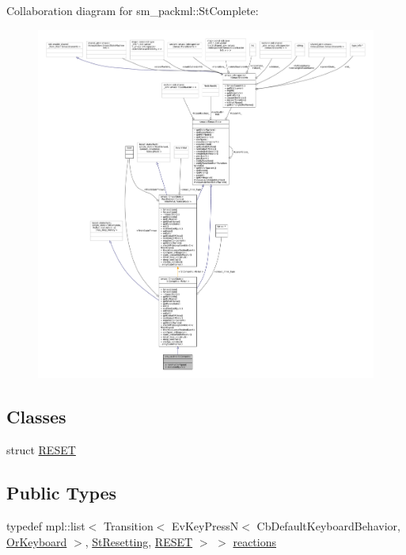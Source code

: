 Collaboration diagram for sm\+\_\+packml\+:\+:St\+Complete\+:
\nopagebreak
\begin{figure}[H]
\begin{center}
\leavevmode
\includegraphics[width=350pt]{structsm__packml_1_1StComplete__coll__graph}
\end{center}
\end{figure}
\subsection*{Classes}
\begin{DoxyCompactItemize}
\item 
struct \hyperlink{structsm__packml_1_1StComplete_1_1RESET}{R\+E\+S\+ET}
\end{DoxyCompactItemize}
\subsection*{Public Types}
\begin{DoxyCompactItemize}
\item 
typedef mpl\+::list$<$ Transition$<$ Ev\+Key\+PressN$<$ Cb\+Default\+Keyboard\+Behavior, \hyperlink{classsm__packml_1_1OrKeyboard}{Or\+Keyboard} $>$, \hyperlink{structsm__packml_1_1StResetting}{St\+Resetting}, \hyperlink{structsm__packml_1_1StComplete_1_1RESET}{R\+E\+S\+ET} $>$ $>$ \hyperlink{structsm__packml_1_1StComplete_abe26a003ec05b72f290f6b5c2497123e}{reactions}
\end{DoxyCompactItemize}
